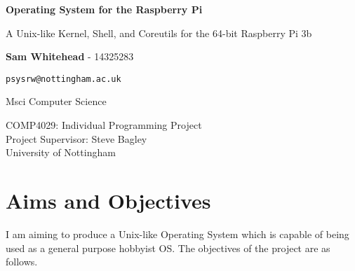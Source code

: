 \documentclass{article}
\begin{document}
\begin{titlepage}
    \begin{center}
        \null\mbox{}\vfill

        \vspace*{1cm}

        \huge
        \textbf{Operating System for the Raspberry Pi}

        \vspace{0.5cm}
        \Large
        A Unix-like Kernel, Shell, and Coreutils for the 64-bit Raspberry Pi 3b

        \Large

        \vspace{1.5cm}

        \textbf{Sam Whitehead} - 14325283

        \texttt{psysrw@nottingham.ac.uk}

        Msci Computer Science

        \vfill

        COMP4029: Individual Programming Project\\
        Project Supervisor: Steve Bagley\\
        University of Nottingham

        \vfill\null
    \end{center}
    \thispagestyle{empty}
\end{titlepage}

\section{Aims and Objectives}
I am aiming to produce a Unix-like Operating System which is capable of being
used as a general purpose hobbyist OS. The objectives of the project are as
follows.
\end{document}
